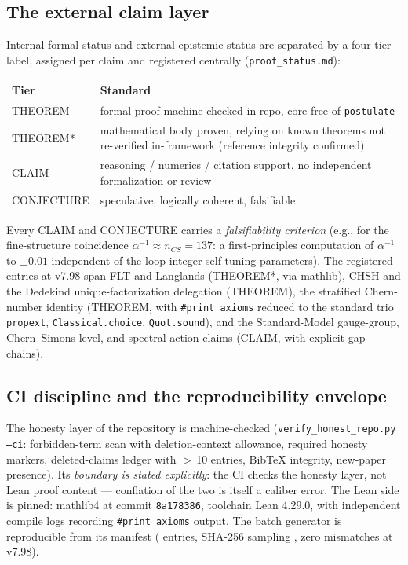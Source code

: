 \subsection{The external claim layer}
\label{sec:claims}
Internal formal status and external epistemic status are separated by
a four-tier label, assigned per claim and registered centrally
(\texttt{proof\_status.md}):

\begin{center}
\begin{tabular}{@{}lp{9.2cm}@{}}
\toprule
\textbf{Tier} & \textbf{Standard} \\
\midrule
THEOREM & formal proof machine-checked in-repo, core free of
\texttt{postulate} \\
THEOREM* & mathematical body proven, relying on known theorems not
re-verified in-framework (reference integrity confirmed) \\
CLAIM & reasoning / numerics / citation support, no independent
formalization or review \\
CONJECTURE & speculative, logically coherent, falsifiable \\
\bottomrule
\end{tabular}
\end{center}

Every CLAIM and CONJECTURE carries a \emph{falsifiability criterion}
(e.g., for the fine-structure coincidence $\alpha^{-1}\!\approx\!
n_{CS}\!=\!137$: a first-principles computation of $\alpha^{-1}$ to
$\pm 0.01$ independent of the loop-integer self-tuning parameters).
The registered entries at v7.98 span FLT and Langlands (THEOREM*, via
mathlib), CHSH and the Dedekind unique-factorization delegation
(THEOREM), the stratified Chern-number identity (THEOREM, with
\texttt{\#print axioms} reduced to the standard trio
\texttt{propext}, \texttt{Classical.choice}, \texttt{Quot.sound}),
and the Standard-Model gauge-group, Chern--Simons level, and spectral
action claims (CLAIM, with explicit gap chains).

\subsection{CI discipline and the reproducibility envelope}
\label{sec:ci}
The honesty layer of the repository is machine-checked
(\texttt{verify\_honest\_repo.py --ci}: forbidden-term scan with
deletion-context allowance, required honesty markers, deleted-claims
ledger with $>$\,10 entries, BibTeX integrity, new-paper presence).
Its \emph{boundary is stated explicitly}: the CI checks the honesty
layer, not Lean proof content --- conflation of the two is itself a
caliber error. The Lean side is pinned: mathlib4 at commit
\texttt{8a178386}, toolchain Lean 4.29.0, with independent compile
logs recording \texttt{\#print axioms} output. The batch generator is
reproducible from its manifest ( entries, SHA-256
sampling , zero mismatches at v7.98).
